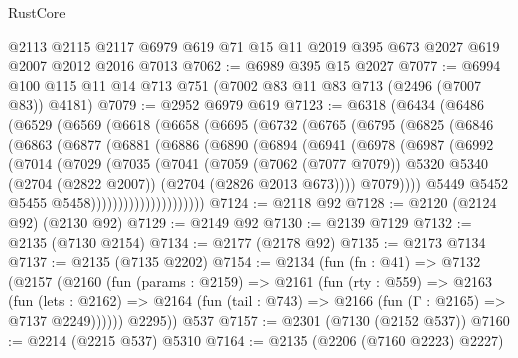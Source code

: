 \begin{lexlean}{RustCore}
\begin{coremodule}
    @2113
    @2115
    @2117
    @6979
    @619
    @71
    @15
    @11
    @2019
    @395
    @673
    @2027
    @619
    @2007
    @2012
    @2016
    @7013
@7062 := @6989 @395 @15 @2027
@7077 := @6994 @100 @115 @11 @14 @713 @751 (@7002 @83 @11 @83 @713 (@2496 (@7007 @83)) @4181)
@7079 := @2952 @6979 @619
@7123 := @6318
    (@6434
      (@6486
        (@6529
          (@6569
            (@6618
              (@6658
                (@6695
                  (@6732
                    (@6765
                      (@6795
                        (@6825
                          (@6846
                            (@6863
                              (@6877
                                (@6881
                                  (@6886
                                    (@6890
                                      (@6894
                                        (@6941
                                          (@6978
                                            (@6987
                                              (@6992
                                                (@7014
                                                  (@7029
                                                    (@7035
                                                      (@7041
                                                        (@7059
                                                          (@7062 (@7077 @7079))
                                                          @5320
                                                          @5340
                                                          (@2704 (@2822 @2007))
                                                          (@2704 (@2826 @2013 @673))))
                                                      @7079))))
                                              @5449
                                              @5452
                                              @5455
                                              @5458)))))))))))))))))))))
@7124 := @2118 @92
@7128 := @2120 (@2124 @92) (@2130 @92)
@7129 := @2149 @92
@7130 := @2139 @7129
@7132 := @2135 (@7130 @2154)
@7134 := @2177 (@2178 @92)
@7135 := @2173 @7134
@7137 := @2135 (@7135 @2202)
@7154 := @2134
    (fun (fn : @41) =>
    @7132
      (@2157
        (@2160
          (fun (params : @2159) =>
          @2161
            (fun (rty : @559) =>
            @2163
              (fun (lets : @2162) =>
              @2164 (fun (tail : @743) => @2166 (fun (Γ : @2165) => @7137 @2249))))))
        @2295))
    @537
@7157 := @2301 (@7130 (@2152 @537))
@7160 := @2214 (@2215 @537) @5310
@7164 := @2135 (@2206 (@7160 @2223) @2227)

\end{coremodule}
\end{lexlean}
